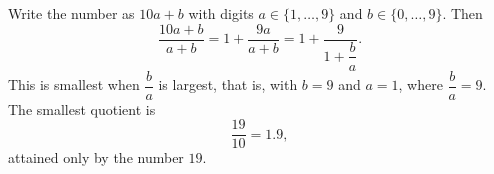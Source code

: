 Write the number as $10a+b$ with digits $a\in\{1,\dots,9\}$ and $b\in\{0,\dots,9\}$. Then
\[
\dfrac{10a+b}{a+b}=1+\dfrac{9a}{a+b}=1+\dfrac{9}{1+\dfrac{b}{a}} .
\]
This is smallest when $\dfrac{b}{a}$ is largest, that is, with $b=9$ and $a=1$, where $\dfrac{b}{a}=9$. The smallest quotient is
\[
\dfrac{19}{10}=\boxed{1.9},
\]
attained only by the number $19$.
